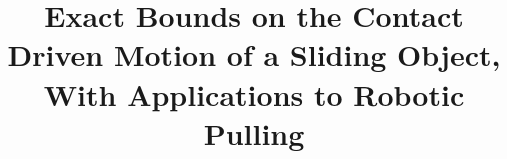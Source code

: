 \documentclass[conference]{IEEEtran}
\begin{document}
\title{\huge Exact Bounds on the Contact Driven Motion of a Sliding
  Object, With Applications to Robotic Pulling}




% 


\maketitle
\end{document}
